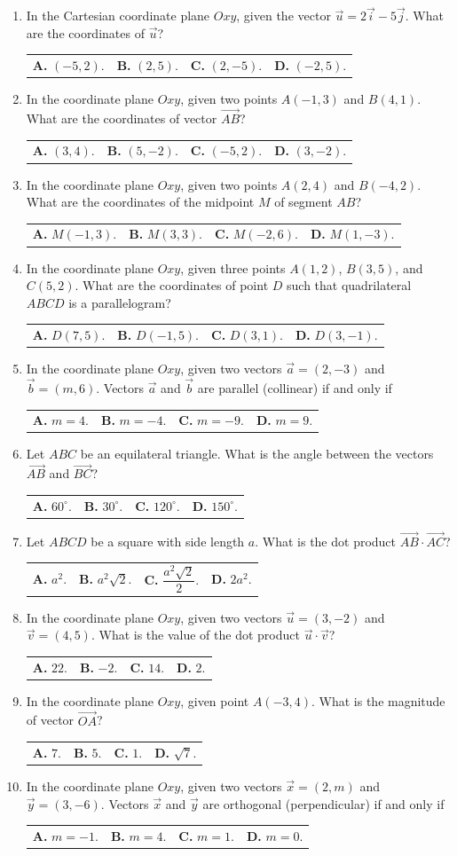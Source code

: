 \documentclass[10pt,a4paper]{article}
\makeatletter
\newcommand{\four}[4]{\par\noindent\begin{tabularx}{\linewidth}{@{}*{4}{>{\raggedright\arraybackslash}X}@{}}\textbf{A.} #1&\textbf{B.} #2&\textbf{C.} #3&\textbf{D.} #4\end{tabularx}}
\makeatother
\begin{document}
\begin{enumerate}
\item In the Cartesian coordinate plane $Oxy$, given the vector $\vec{u} = 2\vec{i} - 5\vec{j}$. What are the coordinates of $\vec{u}$?
\four{$(-5, 2)$.}{$(2, 5)$.}{$(2, -5)$.}{$(-2, 5)$.}

\item In the coordinate plane $Oxy$, given two points $A(-1, 3)$ and $B(4, 1)$. What are the coordinates of vector $\vec{AB}$?
\four{$(3, 4)$.}{$(5, -2)$.}{$(-5, 2)$.}{$(3, -2)$.}

\item In the coordinate plane $Oxy$, given two points $A(2, 4)$ and $B(-4, 2)$. What are the coordinates of the midpoint $M$ of segment $AB$?
\four{$M(-1, 3)$.}{$M(3, 3)$.}{$M(-2, 6)$.}{$M(1, -3)$.}

\item In the coordinate plane $Oxy$, given three points $A(1, 2)$, $B(3, 5)$, and $C(5, 2)$. What are the coordinates of point $D$ such that quadrilateral $ABCD$ is a parallelogram?
\four{$D(7, 5)$.}{$D(-1, 5)$.}{$D(3, 1)$.}{$D(3, -1)$.}
\pagebreak

\item In the coordinate plane $Oxy$, given two vectors $\vec{a} = (2, -3)$ and $\vec{b} = (m, 6)$. Vectors $\vec{a}$ and $\vec{b}$ are parallel (collinear) if and only if
\four{$m = 4$.}{$m = -4$.}{$m = -9$.}{$m = 9$.}

\item Let $ABC$ be an equilateral triangle. What is the angle between the vectors $\vec{AB}$ and $\vec{BC}$?
\four{$60^\circ$.}{$30^\circ$.}{$120^\circ$.}{$150^\circ$.}

\item Let $ABCD$ be a square with side length $a$. What is the dot product $\vec{AB} \cdot \vec{AC}$?
\four{$a^2$.}{$a^2\sqrt{2}$.}{$\dfrac{a^2\sqrt{2}}{2}$.}{$2a^2$.}

\item In the coordinate plane $Oxy$, given two vectors $\vec{u} = (3, -2)$ and $\vec{v} = (4, 5)$. What is the value of the dot product $\vec{u} \cdot \vec{v}$?
\four{$22$.}{$-2$.}{$14$.}{$2$.}

\item In the coordinate plane $Oxy$, given point $A(-3, 4)$. What is the magnitude of vector $\vec{OA}$?
\four{$7$.}{$5$.}{$1$.}{$\sqrt{7}$.}

\item In the coordinate plane $Oxy$, given two vectors $\vec{x} = (2, m)$ and $\vec{y} = (3, -6)$. Vectors $\vec{x}$ and $\vec{y}$ are orthogonal (perpendicular) if and only if
\four{$m = -1$.}{$m = 4$.}{$m = 1$.}{$m = 0$.}


\end{enumerate}
\end{document}
